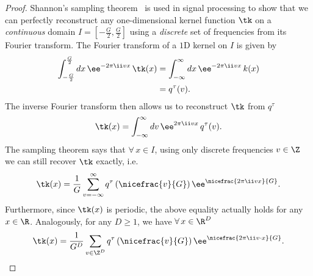 \begin{proof}
Shannon's sampling theorem~\cite{Shannon1949communication,proakis2001digital} is used in signal processing to show that we can perfectly reconstruct any one-dimensional kernel function $\tk$ on a \textit{continuous} domain $I=\left[-\frac{G}{2},\frac{G}{2}\right]$ using a \textit{discrete} set of frequencies from its Fourier transform. The Fourier transform of a $1$D kernel on $I$ is given by
\begin{align}
  \int_{-\frac{G}{2}}^{\frac{G}{2}}dx\,\ee^{-2\pi\ii vx}\, \tk(x)
            &=\int_{-\infty}^{\infty}dx\,\ee^{-2\pi\ii vx}\, k(x) \nonumber\\
            &=q^{\tau}(v).
\end{align}
The inverse Fourier transform then allows us to reconstruct $\tk$ from $q^\tau$
\[
  \tk(x) = \int_{-\infty}^{\infty}dv\,\ee^{2\pi\ii vx}\, q^{\tau}(v).
\]
The sampling theorem says that $\forall\, x\in I$, using only discrete frequencies $v\in\Z$ we can still recover $\tk$ exactly, i.e.\
\begin{equation}
  \label{seq:one_dim}
  \tk(x)=\frac{1}{G}\sum_{v=-\infty}^{\infty}q^{\tau}\left(\nicefrac{v}{G}\right)\ee^{\nicefrac{2\pi\ii v x}{G}}.
\end{equation}
Furthermore, since $\tk(x)$ is periodic, the above equality actually holds for any $x\in\R$.
Analogously, for any $D\geq 1$, we have $\forall\, x\in\R^D$
\begin{equation}
  \label{seq:D_dim}
  \tk(x)=\frac{1}{{G}^D}\sum_{v\in\Z^D}q^{\tau}\left(\nicefrac{v}{G}\right)\ee^{\nicefrac{2\pi\ii v\cdot x}{G}}.
\end{equation}


\end{proof}
